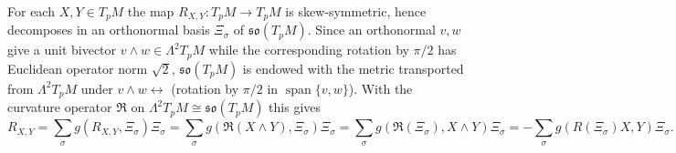 \begin{convention}
  \label{conv:pet-ch9-so-metric-convention}
  For each $X,Y\in T_pM$ the map $R_{X,Y}:T_pM\to T_pM$ is skew-symmetric,
  hence decomposes in an orthonormal basis $\Xi_\sigma$ of
  $\mathfrak{so}(T_pM)$. Since an orthonormal $v,w$ give a unit bivector
  $v\wedge w\in\Lambda^2T_pM$ while the corresponding rotation by $\pi/2$ has
  Euclidean operator norm $\sqrt2$, $\mathfrak{so}(T_pM)$ is endowed with the
  metric transported from $\Lambda^2T_pM$ under $v\wedge w\leftrightarrow$
  (rotation by $\pi/2$ in $\operatorname{span}\{v,w\}$). With the curvature operator
  $\mathfrak{R}$ on $\Lambda^2T_pM\cong\mathfrak{so}(T_pM)$ this gives
  \[
    R_{X,Y}=\sum_\sigma g(R_{X,Y},\Xi_\sigma)\Xi_\sigma
    =\sum_\sigma g(\mathfrak{R}(X\wedge Y),\Xi_\sigma)\Xi_\sigma
    =\sum_\sigma g(\mathfrak{R}(\Xi_\sigma),X\wedge Y)\Xi_\sigma
    =-\sum_\sigma g(R(\Xi_\sigma)X,Y)\Xi_\sigma.
  \]
\end{convention}

